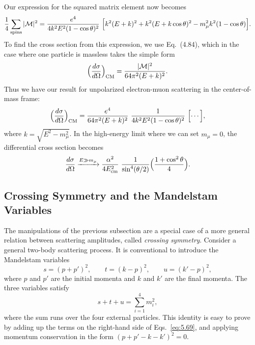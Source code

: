 Our expression for the squared matrix element now becomes
\begin{equation}
  \frac{1}{4}\sum_{\text{spins}}|\mathcal{M}|^2
    = \frac{e^4}{4k^2E^2(1-\cos\theta)^2}\ \Bigl[ k^2(E+k)^2
      + k^2(E+k\cos\theta)^2 - m_\mu^2 k^2(1-\cos\theta) \Bigr] .
  \label{eq:5.62}
\end{equation}
To find the cross section from this expression, we use Eq.~(4.84),
which in the case where one particle is massless takes the simple form
\begin{equation}
  \Bigl( \frac{d\sigma}{d\Omega} \Bigr)_{\mathrm{CM}}
    = \frac{|\mathcal{M}|^2}{64\pi^2(E+k)^2} .
  \label{eq:5.63}
\end{equation}
Thus we have our result for unpolarized electron-muon scattering in the
center-of-mass frame:
\begin{equation}
  \Bigl( \frac{d\sigma}{d\Omega} \Bigr)_{\mathrm{CM}}
    = \frac{e^4}{64\pi^2(E+k)^2}\ \frac{1}{4k^2E^2(1-\cos\theta)^2}\
      \Bigl[ \cdots \Bigr] ,
  \label{eq:5.64}
\end{equation}
where $k = \sqrt{E^2-m_\mu^2}$.  In the high-energy limit where we can set
$m_\mu = 0$, the differential cross section becomes
\begin{equation}
  \frac{d\sigma}{d\Omega} \xrightarrow{E\gg m_\mu}
    \frac{\alpha^2}{4E_{\mathrm{cm}}^2}\ \frac{1}{\sin^4(\theta/2)}
      \Bigl( \frac{1+\cos^2\theta}{4} \Bigr) .
  \label{eq:5.65}
\end{equation}

\subsection{Crossing Symmetry and the Mandelstam Variables}

The manipulations of the previous subsection are a special case of a more
general relation between scattering amplitudes, called \emph{crossing
symmetry}.  Consider a general two-body scattering process.  It is
conventional to introduce the Mandelstam variables
\begin{equation}
  s = (p+p')^2,\qquad t = (k-p)^2,\qquad u = (k'-p)^2 ,
  \label{eq:5.69}
\end{equation}
where $p$ and $p'$ are the initial momenta and $k$ and $k'$ are the final
momenta.  The three variables satisfy
\begin{equation}
  s + t + u = \sum_{i=1}^{4} m_i^2 ,
  \label{eq:5.73}
\end{equation}
where the sum runs over the four external particles.  This identity is easy to
prove by adding up the terms on the right-hand side of Eqs.~\eqref{eq:5.69},
and applying momentum conservation in the form
$(p+p'-k-k')^2 = 0$.

